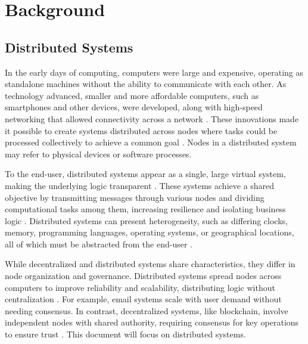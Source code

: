 
\chapter{Background} %

\label{chap:Chapter2} %


\section{Distributed Systems}

In the early days of computing, computers were large and expensive, operating as standalone machines without the ability to communicate with each other. As technology advanced, smaller and more affordable computers, such as smartphones and other devices, were developed, along with high-speed networking that allowed connectivity across a network \cite{Tanenbaum2023}. These innovations made it possible to create systems distributed across nodes where tasks could be processed collectively to achieve a common goal \cite{Sharma2016}. Nodes in a distributed system may refer to physical devices or software processes\cite{Vitillo2021}.

To the end-user, distributed systems appear as a single, large virtual system, making the underlying logic transparent \cite{Naik2021}. These systems achieve a shared objective by transmitting messages through various nodes and dividing computational tasks among them, increasing resilience and isolating business logic \cite{Lamport1978, Sari2015, Vitillo2021}. Distributed systems can present heterogeneity, such as differing clocks, memory, programming languages, operating systems, or geographical locations, all of which must be abstracted from the end-user \cite{Sari2015, Tanenbaum2023}.

While decentralized and distributed systems share characteristics, they differ in node organization and governance. Distributed systems spread nodes across computers to improve reliability and scalability, distributing logic without centralization \cite{Tanenbaum2023}. For example, email systems scale with user demand without needing consensus. In contrast, decentralized systems, like blockchain, involve independent nodes with shared authority, requiring consensus for key operations to ensure trust \cite{aws-decentralization,Tanenbaum2023}. This document will focus on distributed systems.

